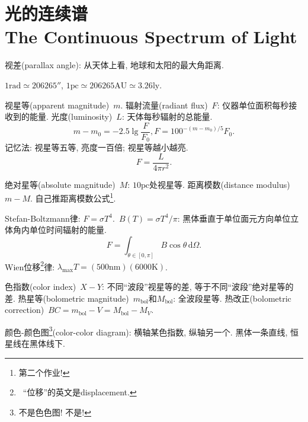 \chapter{光的连续谱\\The Continuous Spectrum of Light}

视差(parallax angle): 从天体上看, 地球和太阳的最大角距离.

$1\text{rad}\simeq 206265''$, $1\text{pc}\simeq 206265\text{AU}\simeq 3.26\text{ly}$.

视星等(apparent magnitude)~$m$. 辐射流量(radiant flux)~$F$: 仪器单位面积每秒接收到的能量. 光度(luminosity)~$L$: 天体每秒辐射的总能量.
\begin{equation*}
    m-m_0 = -2.5\lg \frac{F}{F_0}, F=100^{-(m-m_0)/5}F_0.
\end{equation*}
记忆法: 视星等五等, 亮度一百倍; 视星等越小越亮.
\begin{equation*}
    F = \frac{L}{4\pi r^2}.
\end{equation*}

绝对星等(absolute magnitude)~$M$: $10\text{pc}$处视星等. 距离模数(distance modulus)~$m-M$. 自己推距离模数公式\footnote{第二个作业!}.

Stefan-Boltzmann律: $F=\sigma T^4$.~$B(T)=\sigma T^4/\pi$: 黑体垂直于单位面元方向单位立体角内单位时间辐射的能量.
\begin{equation*}
    F = \int_{\theta\in[0,\pi]}B\cos\theta\,\mathrm{d}\Omega.
\end{equation*}
Wien位移\footnote{~``位移''的英文是displacement.}律: $\lambda_\text{max}T=(500\text{nm})(6000\text{K})$.

色指数(color index)~$X-Y$: 不同``波段''视星等的差, 等于不同``波段''绝对星等的差. 热星等(bolometric magnitude)~$m_\text{bol}$和$M_\text{bol}$: 全波段星等. 热改正(bolometric correction)~$BC=m_\text{bol}-V=M_\text{bol}-M_V$.

颜色-颜色图\footnote{不是色色图! 不是!}(color-color diagram): 横轴某色指数, 纵轴另一个. 黑体一条直线, 恒星线在黑体线下.
